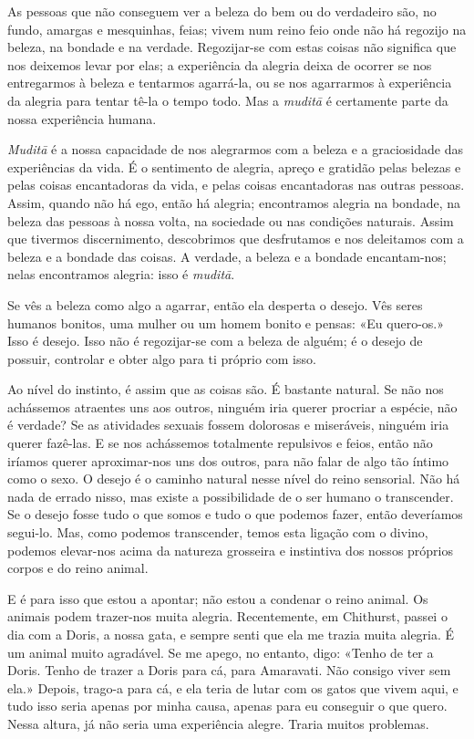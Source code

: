 As pessoas que não conseguem ver a beleza do bem ou do verdadeiro são, no fundo,
amargas e mesquinhas, feias; vivem num reino feio onde não há regozijo na
beleza, na bondade e na verdade. Regozijar-se com estas coisas não significa
que nos deixemos levar por elas; a experiência da alegria deixa de ocorrer se
nos entregarmos à beleza e tentarmos agarrá-la, ou se nos agarrarmos à
experiência da alegria para tentar tê-la o tempo todo. Mas a \emph{muditā} é
certamente parte da nossa experiência humana.

\emph{Muditā} é a nossa capacidade de nos alegrarmos com a beleza e a
graciosidade das experiências da vida. É o sentimento de alegria, apreço e
gratidão pelas belezas e pelas coisas encantadoras da vida, e pelas coisas
encantadoras nas outras pessoas. Assim, quando não há ego, então há alegria;
encontramos alegria na bondade, na beleza das pessoas à nossa volta, na
sociedade ou nas condições naturais. Assim que tivermos discernimento,
descobrimos que desfrutamos e nos deleitamos com a beleza e a bondade das
coisas. A verdade, a beleza e a bondade encantam-nos; nelas encontramos
alegria: isso é \emph{muditā}.

Se vês a beleza como algo a agarrar, então ela desperta o desejo. Vês seres
humanos bonitos, uma mulher ou um homem bonito e pensas: «Eu quero-os.» Isso é
desejo. Isso não é regozijar-se com a beleza de alguém; é o desejo de possuir,
controlar e obter algo para ti próprio com isso.

Ao nível do instinto, é assim que as coisas são. É bastante natural. Se não nos
achássemos atraentes uns aos outros, ninguém iria querer procriar a espécie, não
é verdade? Se as atividades sexuais fossem dolorosas e miseráveis, ninguém iria
querer fazê-las. E se nos achássemos totalmente repulsivos e feios, então não
iríamos querer aproximar-nos uns dos outros, para não falar de algo tão íntimo
como o sexo. O desejo é o caminho natural nesse nível do reino sensorial. Não há
nada de errado nisso, mas existe a possibilidade de o ser humano o transcender.
Se o desejo fosse tudo o que somos e tudo o que podemos fazer, então deveríamos
segui-lo. Mas, como podemos transcender, temos esta ligação com o divino,
podemos elevar-nos acima da natureza grosseira e instintiva dos nossos próprios
corpos e do reino animal.

E é para isso que estou a apontar; não estou a condenar o reino animal. Os
animais podem trazer-nos muita alegria. Recentemente, em Chithurst, passei o
dia com a Doris, a nossa gata, e sempre senti que ela me trazia muita alegria. É
um animal muito agradável. Se me apego, no entanto, digo: «Tenho de ter a Doris.
Tenho de trazer a Doris para cá, para Amaravati. Não consigo viver sem ela.»
Depois, trago-a para cá, e ela teria de lutar com os gatos que vivem aqui, e
tudo isso seria apenas por minha causa, apenas para eu conseguir o que quero.
Nessa altura, já não seria uma experiência alegre. Traria muitos problemas.

